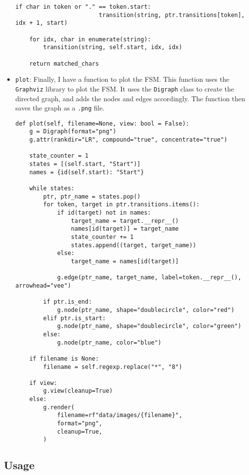 \documentclass[12pt]{report}
\begin{document}
\begin{itemize}
\begin{lstlisting}[caption={\texttt{FSM.match}}]
                    if char in token or "." == token.start:
                        transition(string, ptr.transitions[token], idx + 1, start)

    for idx, char in enumerate(string):
        transition(string, self.start, idx, idx)

    return matched_chars
        \end{lstlisting}
    \item \texttt{plot}: Finally, I have a function to plot the FSM. This function uses the \texttt{Graphviz} library to plot the FSM. It uses the \texttt{Digraph} class to create the directed graph, and adds the nodes and edges accordingly. The function then saves the graph as a \texttt{.png} file.
          \begin{lstlisting}[caption={\texttt{FSM.plot}}]
def plot(self, filename=None, view: bool = False):
    g = Digraph(format="png")
    g.attr(rankdir="LR", compound="true", concentrate="true")

    state_counter = 1
    states = [(self.start, "Start")]
    names = {id(self.start): "Start"}

    while states:
        ptr, ptr_name = states.pop()
        for token, target in ptr.transitions.items():
            if id(target) not in names:
                target_name = target.__repr__()
                names[id(target)] = target_name
                state_counter += 1
                states.append((target, target_name))
            else:
                target_name = names[id(target)]

            g.edge(ptr_name, target_name, label=token.__repr__(), arrowhead="vee")

        if ptr.is_end:
            g.node(ptr_name, shape="doublecircle", color="red")
        elif ptr.is_start:
            g.node(ptr_name, shape="doublecircle", color="green")
        else:
            g.node(ptr_name, color="blue")

    if filename is None:
        filename = self.regexp.replace("*", "8")

    if view:
        g.view(cleanup=True)
    else:
        g.render(
            filename=rf"data/images/{filename}",
            format="png",
            cleanup=True,
        )
        \end{lstlisting}
\end{itemize}

\subsection{Usage}
\end{document}
